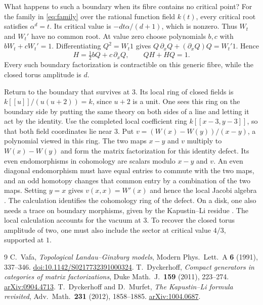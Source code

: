 \documentclass{momentum}
\begin{document}
What happens to such a boundary when its fibre contains no critical
point? For the family in \eqref{eq:family} over the rational function field
\(k(t)\), every critical root satisfies \(\alpha^d=t\). Its critical
value is \(-dt\alpha/(d+1)\), which is nonzero. Thus \(W_t\) and \(W_t'\)
have no common root. At value zero choose polynomials \(b,c\) with
\(bW_t+cW_t'=1\). Differentiating \(Q^2=W_t1\) gives
\(Q\,\partial_xQ+(\partial_xQ)Q=W_t'1\). Hence
\[
 H=\tfrac12 bQ+c\,\partial_xQ,\qquad QH+HQ=1 .
\]
Every such boundary factorization is contractible on this generic
fibre, while the closed torus amplitude is \(d\).

Return to the boundary that survives at \(3\). Its local ring of
closed fields is \(k[[u]]/(u(u+2))=k\), since \(u+2\) is a unit.
One sees this ring on the boundary side by putting the same theory on
both sides of a line and letting it act by the identity. Use the completed local coefficient ring \(k[[x-3,y-3]]\), so that both
field coordinates lie near \(3\). Put \(v=(W(x)-W(y))/(x-y)\), a
polynomial viewed in this ring. The two maps
\(x-y\) and \(v\) multiply to \(W(x)-W(y)\) and form the matrix
factorization for this identity defect. Its even endomorphisms in
cohomology are scalars modulo \(x-y\) and \(v\). An even diagonal
endomorphism must have equal entries to commute with the two maps,
and an odd homotopy changes that common entry by a combination
of the two maps. Setting \(y=x\) gives \(v(x,x)=W'(x)\) and hence
the local Jacobi algebra \cite[Prop.~6.3 and Cor.~6.4--6.5]{dyck}.
The calculation identifies the cohomology ring of the defect. On a disk,
one also needs a trace on boundary morphisms, given by the Kapustin--Li
residue \cite[Thm.~3.4 and \S5.1, Eq.~(33)]{dm}. The local calculation
accounts for the vacuum at \(3\). To recover the closed torus amplitude
of two, one must also include the sector at critical value \(4/3\),
supported at \(1\).

\begin{thebibliography}{9}\small
{} C.~Vafa, \emph{Topological Landau--Ginzburg models},
Modern Phys.\ Lett.\ A \textbf{6} (1991), 337--346.
\href{https://doi.org/10.1142/S0217732391000324}{doi:10.1142/S0217732391000324}.
 T.~Dyckerhoff, \emph{Compact generators in categories of
matrix factorizations}, Duke Math.\ J.\ \textbf{159} (2011), 223--274.
\href{https://arxiv.org/abs/0904.4713}{arXiv:0904.4713}.
 T.~Dyckerhoff and D.~Murfet, \emph{The
Kapustin--Li formula revisited}, Adv.\ Math.\ \textbf{231} (2012),
1858--1885. \href{https://arxiv.org/abs/1004.0687}{arXiv:1004.0687}.
\end{thebibliography}
\end{document}
